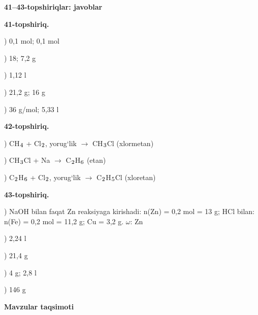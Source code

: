 \documentclass[11pt,a4paper]{article}
\renewcommand{\textsubscript}[1]{\ensuremath{_{\text{\fontsize{8}{8}\selectfont #1}}}}
\begin{document}
\noindent\textbf{41--43-topshiriqlar: javoblar}\par\smallskip
\noindent\textbf{41-topshiriq.}\par
{}) 0,1 mol; 0,1 mol\par
{}) 18; 7,2 g\par
{}) 1,12 l\par
{}) 21,2 g; 16 g\par
{}) 36 g/mol; 5,33 l\par
\noindent\textbf{42-topshiriq.}\par
{}) CH\textsubscript{4} + Cl\textsubscript{2}, yorug`lik $\to$ CH\textsubscript{3}Cl (xlormetan)\par
{}) CH\textsubscript{3}Cl + Na $\to$ C\textsubscript{2}H\textsubscript{6} (etan)\par
{}) C\textsubscript{2}H\textsubscript{6} + Cl\textsubscript{2}, yorug`lik $\to$ C\textsubscript{2}H\textsubscript{5}Cl (xloretan)\par
\noindent\textbf{43-topshiriq.}\par
{}) NaOH bilan faqat Zn reaksiyaga kirishadi: n(Zn) = 0,2 mol = 13 g; HCl bilan: n(Fe) = 0,2 mol = 11,2 g; Cu = 3,2 g. $\omega$: Zn\par
{}) 2,24 l\par
{}) 21,4 g\par
{}) 4 g; 2,8 l\par
{}) 146 g\par
\par\bigskip\noindent\textbf{Mavzular taqsimoti}\par\smallskip
\end{document}
